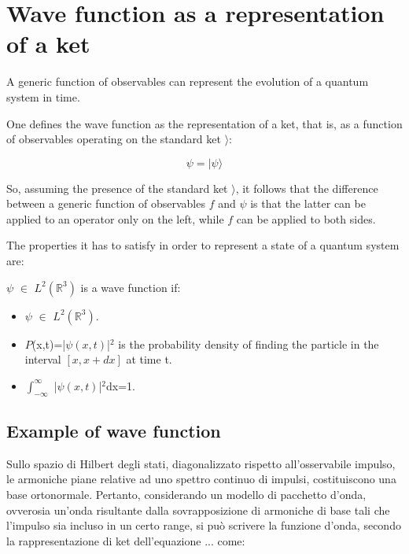 \documentclass{report}
\begin{document}
\section{Wave function as a representation of a ket}

A generic function of observables can represent the evolution of a quantum system in time.

One defines the wave function as the representation of a ket, that is, as a function of observables operating on the standard ket $\rangle $:

\begin{equation}
  \psi = |\psi\rangle
\end{equation}

So, assuming the presence of the standard ket $\rangle $, it follows that the difference between a generic function of observables $f$ and $\psi$ is that
the latter can be applied to an operator only on the left, while $f$ can be applied to both sides.

The properties it has to satisfy in order to represent a state of a quantum system are:

\begin{tcolorbox}[colframe=gray!90, colback=blue!5, coltitle=white, title=\textbf{Definition: Wave Function}, fonttitle=\large\bfseries]
  $\psi$ $\in$ $L^2(\mathbb{R}^3)$ is a wave function if:
  \begin{itemize}
    \item $\psi$ $\in$ $L^2(\mathbb{R}^3)$.
    \item $P$(x,t)=|$\psi(x,t)$|$^2$ is the probability density of finding the particle in the interval $[x,x+dx]$ at time t.
    \item $\int_{-\infty}^{\infty}$ |$\psi(x,t)$|$^2$dx=1.
  \end{itemize}
\end{tcolorbox}


\subsection{Example of wave function}
Sullo spazio di Hilbert degli stati, diagonalizzato rispetto all'osservabile impulso, le armoniche piane relative ad uno spettro continuo di impulsi, costituiscono una base ortonormale.
Pertanto, considerando un modello di pacchetto d'onda, ovverosia un'onda risultante dalla sovrapposizione di armoniche di base tali che l'impulso sia incluso in
un certo range, si può scrivere la funzione d'onda, secondo la rappresentazione di ket dell'equazione ... come:
\end{document}
